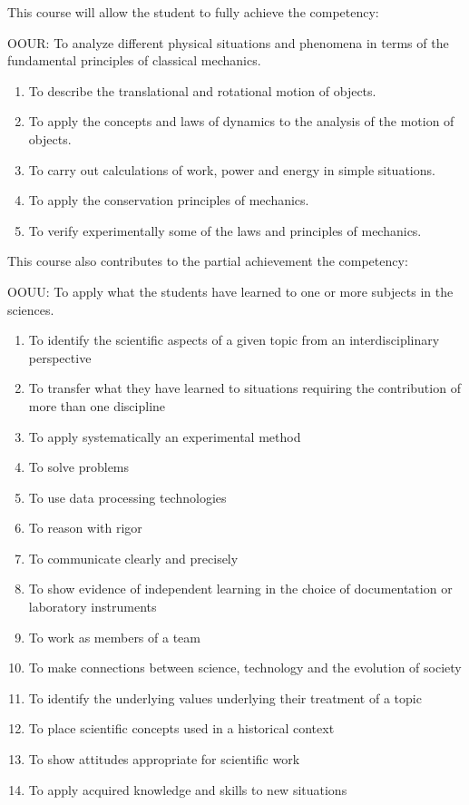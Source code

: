 {This course will allow the student to fully achieve the competency:

OOUR: To analyze different physical situations and phenomena in terms of the fundamental principles of classical mechanics.
\begin{enumerate}
\item To describe the translational and rotational motion of objects.
\item To apply the concepts and laws of dynamics to the analysis of the motion of objects.
\item To carry out calculations of work, power and energy in simple situations.
\item To apply the conservation principles of mechanics.
\item To verify experimentally some of the laws and principles of mechanics.
\end{enumerate}
\smallskip
This course also contributes to the partial achievement the competency:

OOUU:	To apply what the students have learned to one or more subjects in the sciences.
\begin{enumerate}
\item To identify the scientific aspects of a given topic from an interdisciplinary perspective
\item To transfer what they have learned to situations requiring the contribution of more than one discipline
\item To apply systematically an experimental method
\item To solve problems
\item To use data processing technologies	
\item To reason with rigor
\item To communicate clearly and precisely
\item To show evidence of independent learning in the choice of documentation or laboratory instruments
\item To work as members of a team
\item To make connections between science, technology and the evolution of society
\item To identify the underlying values underlying their treatment of a topic
\item To place scientific concepts used in a historical context
\item To show attitudes appropriate for scientific work 
\item To apply acquired knowledge and skills to new situations
\end{enumerate}
}
